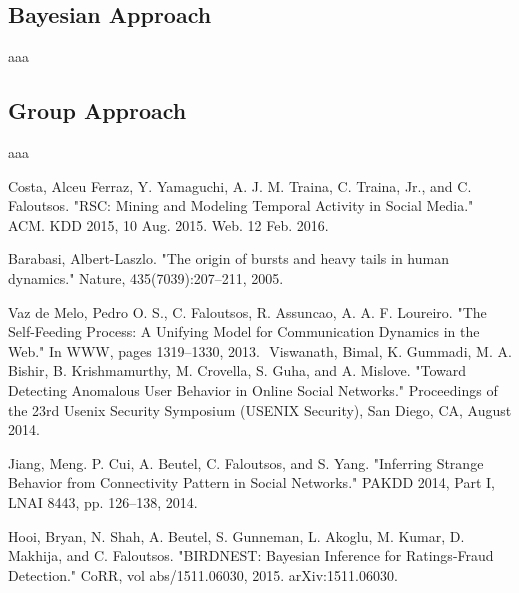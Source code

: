 \documentclass[11pt, oneside]{article}   	%
\begin{document}
\subsection*{Bayesian Approach}

aaa

\subsection*{Group Approach}

aaa

\begin{thebibliography}{123}

 Costa, Alceu Ferraz, Y. Yamaguchi, A. J. M. Traina, C. Traina, Jr., and C. Faloutsos. "RSC: Mining and Modeling Temporal Activity in Social Media." ACM. KDD 2015, 10 Aug. 2015. Web. 12 Feb. 2016.

 Barabasi, Albert-Laszlo. "The origin of bursts and heavy tails in human dynamics." Nature, 435(7039):207–211, 2005. 

 Vaz de Melo, Pedro O. S., C. Faloutsos, R. Assuncao, A. A. F. Loureiro. "The Self-Feeding Process: A Unifying Model for Communication Dynamics in the Web." In WWW, pages 1319–1330, 2013. 
 Viswanath, Bimal, K. Gummadi, M. A. Bishir, B. Krishmamurthy, M. Crovella, S. Guha, and A. Mislove. "Toward Detecting Anomalous User Behavior in Online Social Networks." Proceedings of the 23rd Usenix Security Symposium (USENIX Security), San Diego, CA, August 2014.

 Jiang, Meng. P. Cui, A. Beutel, C. Faloutsos, and S. Yang. "Inferring Strange Behavior from Connectivity Pattern in Social Networks." PAKDD 2014, Part I, LNAI 8443, pp. 126–138, 2014. 

 Hooi, Bryan, N. Shah, A. Beutel, S. Gunneman, L. Akoglu, M. Kumar, D. Makhija, and C. Faloutsos. "BIRDNEST: Bayesian Inference for Ratings-Fraud Detection." CoRR, vol abs/1511.06030, 2015. arXiv:1511.06030.


\end{thebibliography}
\end{document}
